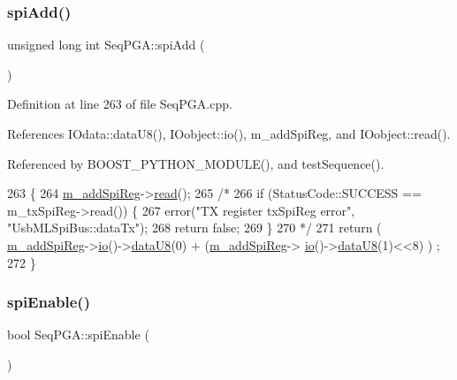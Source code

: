 \subsubsection{\texorpdfstring{spi\+Add()}{spiAdd()}}
{\footnotesize\ttfamily unsigned long int Seq\+P\+G\+A\+::spi\+Add (\begin{DoxyParamCaption}{ }\end{DoxyParamCaption})}



Definition at line 263 of file Seq\+P\+G\+A.\+cpp.



References I\+Odata\+::data\+U8(), I\+Oobject\+::io(), m\+\_\+add\+Spi\+Reg, and I\+Oobject\+::read().



Referenced by B\+O\+O\+S\+T\+\_\+\+P\+Y\+T\+H\+O\+N\+\_\+\+M\+O\+D\+U\+L\+E(), and test\+Sequence().


\begin{DoxyCode}
263                                 \{
264   \hyperlink{classSeqPGA_af31d87ad56c501584ccb9c60776a1289}{m\_addSpiReg}->\hyperlink{classIOobject_aa07610c11963b1db6710e3c76ceea456}{read}();
265   \textcolor{comment}{/*}
266 \textcolor{comment}{    if (StatusCode::SUCCESS == m\_txSpiReg->read()) \{}
267 \textcolor{comment}{    error("TX register txSpiReg error", "UsbMLSpiBus::dataTx");}
268 \textcolor{comment}{    return false;}
269 \textcolor{comment}{    \}}
270 \textcolor{comment}{  */}
271   \textcolor{keywordflow}{return} ( \hyperlink{classSeqPGA_af31d87ad56c501584ccb9c60776a1289}{m\_addSpiReg}->\hyperlink{classIOobject_af04fb94137c3d86849f478ac5afab5d1}{io}()->\hyperlink{classIOdata_a75e9c318dbac3a39402179070943d4bc}{dataU8}(0) + (\hyperlink{classSeqPGA_af31d87ad56c501584ccb9c60776a1289}{m\_addSpiReg}->
      \hyperlink{classIOobject_af04fb94137c3d86849f478ac5afab5d1}{io}()->\hyperlink{classIOdata_a75e9c318dbac3a39402179070943d4bc}{dataU8}(1)<<8) ) ;
272 \}
\end{DoxyCode}
\mbox{\label{classSeqPGA_a6be337fc18199d758430bd178542abb4}} 
\subsubsection{\texorpdfstring{spi\+Enable()}{spiEnable()}}
{\footnotesize\ttfamily bool Seq\+P\+G\+A\+::spi\+Enable (\begin{DoxyParamCaption}{ }\end{DoxyParamCaption})}




